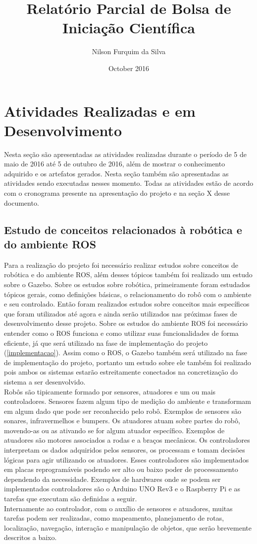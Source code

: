 \documentclass{article}
\title{Relatório Parcial de Bolsa de Iniciação Científica}
\date{October 2016}
\author{Nilson Furquim da Silva}
\begin{document}
\maketitle
\chapter{Atividades Realizadas e em Desenvolvimento}
Nesta seção são apresentadas as atividades realizadas durante o período de 5 de maio de 2016 até 5 de outubro de 2016, além de mostrar o conhecimento adquirido e os artefatos gerados. Nesta seção também são apresentadas as atividades sendo executadas nesses momento. Todas as atividades estão de acordo com o cronograma presente na apresentação do projeto e na seção X desse documento.   

\section{Estudo de conceitos relacionados à robótica e do ambiente ROS}
Para a realização do projeto foi necessário realizar estudos sobre conceitos de robótica e do ambiente ROS, além desses tópicos também foi realizado um estudo sobre o Gazebo. Sobre os estudos sobre robótica, primeiramente foram estudados tópicos gerais, como definições básicas, o relacionamento do robô com o ambiente e seu controlado. Então foram realizados estudos sobre conceitos mais específicos que foram utilizados até agora e ainda serão utilizados nas próximas fases de desenvolvimento desse projeto. Sobre os estudos do ambiente ROS foi necessário entender como o ROS funciona e como utilizar suas funcionalidades de forma eficiente, já que será utilizado na fase de implementação do projeto (\ref{implementacao}). Assim como o ROS, o Gazebo também será utilizado na fase de implementação do projeto, portanto um estudo sobre ele também foi realizado pois ambos os sistemas estarão estreitamente conectados na concretização do sistema a ser desenvolvido.\\
Robôs são tipicamente formado por sensores, atuadores e um ou mais controladores. Sensores fazem algum tipo de medição do ambiente e transformam em algum dado que pode ser reconhecido pelo robô. Exemplos de sensores são sonares, infravermelhos e bumpers. Os atuadores atuam sobre partes do robô, movendo-as ou as ativando se for algum atuador específico. Exemplos de atuadores são motores associados a rodas e a braços mecânicos. Os controladores interpretam os dados adquiridos pelos sensores, os processam e tomam decisões lógicas para agir utilizando os atuadores. Esses controladores são implementados em placas reprogramáveis podendo ser alto ou baixo poder de processamento dependendo da necessidade. Exemplos de hardwares onde se podem ser implementados controladores são o Arduino UNO Rev3 e o Raspberry Pi e as tarefas que executam são definidas a seguir.\\
Internamente ao controlador, com o auxílio de sensores e atuadores, muitas tarefas podem ser realizadas, como mapeamento, planejamento de rotas, localização, navegação, interação e manipulação de objetos, que serão brevemente descritos a baixo.\\
\end{document}
